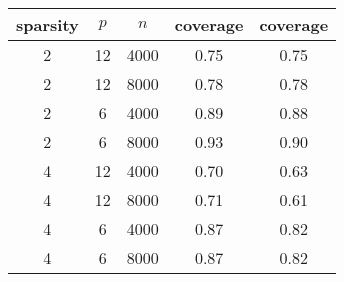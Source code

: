 \begin{table}[ht]
\centering
\begin{tabular}{|ccc|cc|}
  \hline
sparsity & $p$ & $n$ & coverage & coverage \\ 
  \hline
2 & 12 & 4000 & 0.75 & 0.75 \\ 
  2 & 12 & 8000 & 0.78 & 0.78 \\ 
  2 & 6 & 4000 & 0.89 & 0.88 \\ 
  2 & 6 & 8000 & 0.93 & 0.90 \\ 
   \hline
4 & 12 & 4000 & 0.70 & 0.63 \\ 
  4 & 12 & 8000 & 0.71 & 0.61 \\ 
  4 & 6 & 4000 & 0.87 & 0.82 \\ 
  4 & 6 & 8000 & 0.87 & 0.82 \\ 
   \hline
\end{tabular}
\end{table}
